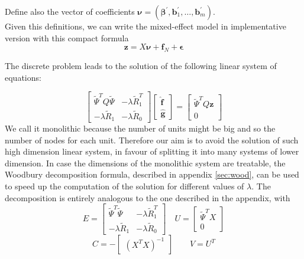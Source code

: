 Define also the vector of coefficients $\bm{\nu} = (\bm{\beta}^\prime, \bm{b}_1^\prime, \dots, \bm{b}_m^\prime)$.\\
Given this definitions, we can write the mixed-effect model in implementative version with this compact formula
\begin{equation}
    \label{modelX}
    \bm{z} = X \bm{\nu} + \bm{f}_N + \bm{\epsilon}
\end{equation}

The discrete problem leads to the solution of the following linear system of equations:

\begin{equation}
    \label{mono}
    \begin{bmatrix}
        \tilde{\Psi}^TQ\tilde{\Psi} & -\lambda \tilde{R}_1^T\\
        -\lambda \tilde{R}_1  & -\lambda \tilde{R}_0
    \end{bmatrix}
    \begin{bmatrix}
        \hat{\mathbf{f}}\\
        \hat{\mathbf{g}}
    \end{bmatrix}
    = 
    \begin{bmatrix}
        \tilde{\Psi}^T Q\mathbf{z}\\
        0
    \end{bmatrix}
\end{equation}
We call it monolithic because the number of units might be big and so the number of nodes for each unit. Therefore our aim is to avoid the solution of such high dimension linear system, in favour of splitting it into many systems of lower dimension.
In case the dimensions of the monolithic system are treatable, the Woodbury decomposition formula, described in appendix \ref{sec:wood}, can be used to speed up the computation of the solution for different values of $\lambda$. The decomposition is entirely analogous to the one described in the appendix, with
\begin{equation}
    \label{eq:wootilde}
    E =
    \begin{bmatrix}
        \tilde{\Psi}^T\tilde{\Psi} & -\lambda \tilde{R}_1^T\\
        -\lambda \tilde{R}_1  & -\lambda \tilde{R}_0
    \end{bmatrix}
\quad
    U = 
    \begin{bmatrix}
        \tilde{\Psi}^TX\\
        0
    \end{bmatrix}
\end{equation}
\begin{equation*}
    C = -
    \begin{bmatrix}
        \left(X^TX\right)^{-1}
    \end{bmatrix}
\quad \quad
    V = U^T
\end{equation*}

